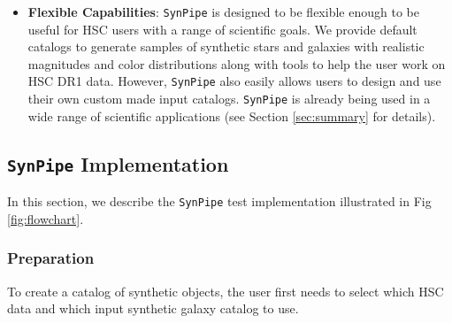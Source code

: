 \documentclass[useamsfonts]{pasj01}
\def\synpipe{\texttt{SynPipe}}
\begin{document}
\begin{itemize}
        \item \textbf{Flexible Capabilities}: 
            \synpipe{} is designed to be flexible enough to be useful for HSC users 
            with a range of scientific goals.
            We provide default catalogs to generate samples of synthetic stars
            and galaxies with realistic magnitudes and color distributions along with
            tools to help the user work on HSC DR1 data. 
            However, \synpipe{} also easily allows users to design and use their own 
            custom made input catalogs.
            \synpipe{} is already being used in a wide range of
            scientific applications (see Section \ref{sec:summary} for details).

    \end{itemize}

\subsection{\synpipe{} Implementation }
    \label{ssec:flowchart}

    In this section, we describe the \synpipe{} test implementation illustrated in 
    Fig \ref{fig:flowchart}.

\subsubsection{Preparation}
    \label{sssec:prep}

    To create a catalog of synthetic objects, the user first needs to select which HSC 
    data and which input synthetic galaxy catalog to use. 
\end{document}

